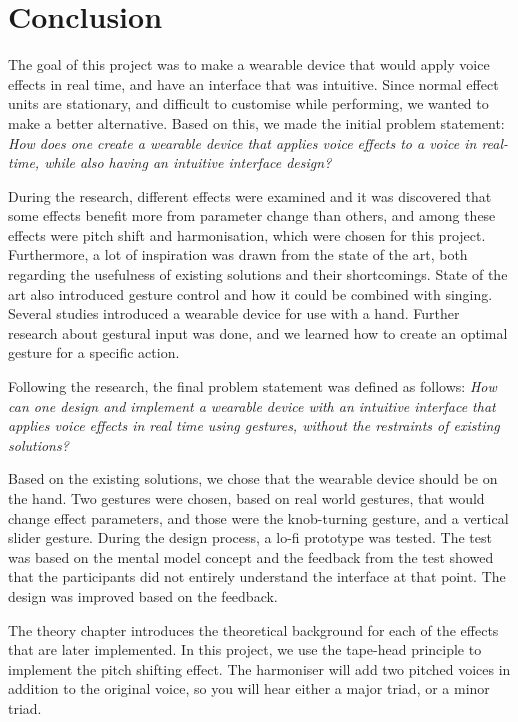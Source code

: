 \chapter{Conclusion}

The goal of this project was to make a wearable device that would apply voice effects in real time, and have an interface that was intuitive. Since normal effect units are stationary, and difficult to customise while performing, we wanted to make a better alternative. Based on this, we made the initial problem statement:
\textit{How does one create a wearable device that applies voice effects to a voice in real-time, while also having an intuitive interface design?}

During the research, different effects were examined and it was discovered that some effects benefit more from parameter change than others, and among these effects were pitch shift and harmonisation, which were chosen for this project. Furthermore, a lot of inspiration was drawn from the state of the art, both regarding the usefulness of existing solutions and their shortcomings. State of the art also introduced gesture control and how it could be combined with singing. Several studies introduced a wearable device for use with a hand. Further research about gestural input was done, and we learned how to create an optimal gesture for a specific action.

Following the research, the final problem statement was defined as follows: 
\textit{How can one design and implement a wearable device with an intuitive interface that applies voice effects in real time using gestures, without the restraints of existing solutions?}

Based on the existing solutions, we chose that the wearable device should be on the hand. Two gestures were chosen, based on real world gestures,  that would change effect parameters, and those were the knob-turning gesture, and a vertical slider gesture. During the design process, a lo-fi prototype was tested. The test was based on the mental model concept and the feedback from the test showed that the participants did not entirely understand the interface at that point. The design was improved based on the feedback.

The theory chapter introduces the theoretical background for each of the effects that are later implemented. In this project, we use the tape-head principle to implement the pitch shifting effect. The harmoniser will add two pitched voices in addition to the original voice, so you will hear either a major triad, or a minor triad.

